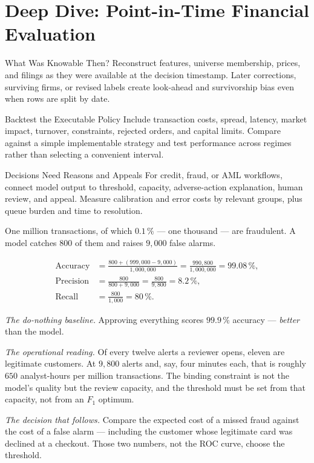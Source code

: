 %
\section{Deep Dive: Point-in-Time Financial Evaluation}
\begin{v3topic}{What Was Knowable Then?}
Reconstruct features, universe membership, prices, and filings as they were
available at the decision timestamp.
Later corrections, surviving firms, or revised labels create look-ahead and
survivorship bias even when rows are split by date.

\end{v3topic}
\begin{v3topic}{Backtest the Executable Policy}
Include transaction costs, spread, latency, market impact, turnover,
constraints, rejected orders, and capital limits.
Compare against a simple implementable strategy and test performance across
regimes rather than selecting a convenient interval.

\end{v3topic}
\begin{v3topic}{Decisions Need Reasons and Appeals}
For credit, fraud, or AML workflows, connect model output to threshold,
capacity, adverse-action explanation, human review, and appeal.
Measure calibration and error costs by relevant groups, plus queue burden and
time to resolution.
\end{v3topic}


\begin{workedexample}
One million transactions, of which $0.1\,\%$ --- one thousand --- are
fraudulent. A model catches $800$ of them and raises $9{,}000$ false alarms.

\[
\begin{aligned}
  \text{Accuracy} &= \frac{800 + (999{,}000-9{,}000)}{1{,}000{,}000}
    = \frac{990{,}800}{1{,}000{,}000} = 99.08\,\%,\\[3pt]
  \text{Precision} &= \frac{800}{800+9{,}000} = \frac{800}{9{,}800}
    = 8.2\,\%,\\[3pt]
  \text{Recall} &= \frac{800}{1{,}000} = 80\,\% .
\end{aligned}
\]

\emph{The do-nothing baseline.} Approving everything scores
$99.9\,\%$ accuracy --- \emph{better} than the model.

\emph{The operational reading.} Of every twelve alerts a reviewer opens, eleven
are legitimate customers. At $9{,}800$ alerts and, say, four minutes each, that
is roughly $650$ analyst-hours per million transactions. The binding constraint
is not the model's quality but the review capacity, and the threshold must be
set from that capacity, not from an $F_1$ optimum.

\emph{The decision that follows.} Compare the expected cost of a missed fraud
against the cost of a false alarm --- including the customer whose legitimate
card was declined at a checkout. Those two numbers, not the ROC curve, choose
the threshold.
\end{workedexample}

